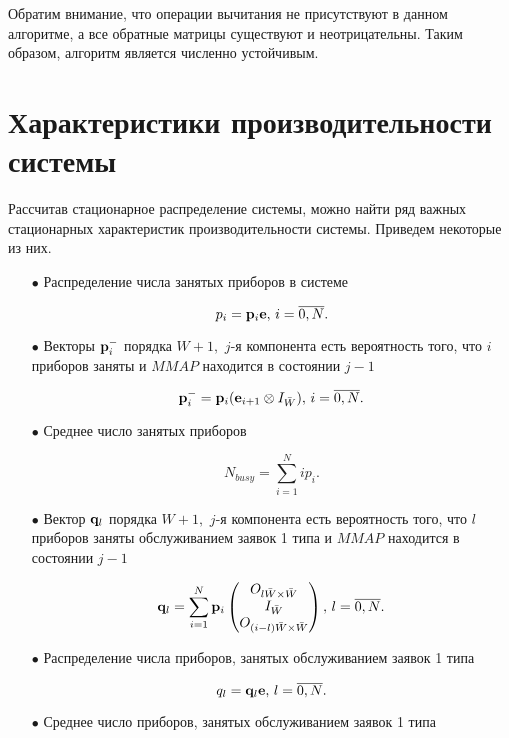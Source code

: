 \documentclass[12pt, a4paper]{article}
\begin{document}
	
	Обратим внимание, что операции вычитания не присутствуют  в данном
	алгоритме, а все обратные  матрицы существуют и неотрицательны.
	Таким образом, алгоритм является  численно устойчивым.
	
	\section{ Характеристики производительности системы}
	
	Рассчитав стационарное  распределение системы, можно
	найти  ряд важных стационарных характеристик производительности
	системы. Приведем некоторые из них.
	
	\begin{itemize}
		\item[$\bullet$] Распределение числа занятых приборов в системе
		
		$$
		p_i={\bf p}_i{\bf e}, \,i=\overline{0,N}.
		$$
		
		\item[$\bullet$] Векторы ${\bf p}_i^-$ порядка $W+1,$ $j$-я компонента есть вероятность того, что $i$ приборов 
		заняты и $MMAP$ находится в состоянии $j-1$
		
		$$
		{\bf p}_i^-={\bf p}_i ({\bf e}_{i+1}\otimes I_{\bar{W}}),\,i=\overline{0,N}.
		$$
		
		
		
		
		
		
		\item[$\bullet$] Среднее  число занятых приборов
		
		$$
		N_{busy}=\sum\limits_{i=1}^N i p_i.
		$$
		
		\item[$\bullet$] Вектор ${\bf q}_l$ порядка $W+1,$ $j$-я компонента есть вероятность того, что $l$ приборов заняты 
		обслуживанием заявок 1 типа и $MMAP$ находится в состоянии $j-1$
		
		$$
		{\bf q}_l=\sum\limits_{i=1}^N {\bf p}_i
		\begin{pmatrix}
		O_{l\bar {W}\times\bar {W}}\cr
		I_{\bar{W}}\cr
		O_{(i-l)\bar {W}\times \bar {W}}\cr
		\end{pmatrix},\,l=\overline{0,N}.
		$$
		
		\item[$\bullet$] Распределение числа  приборов, занятых обслуживанием заявок 1 типа
		
		$$
		q_l={\bf q}_l{\bf e}, \,l=\overline{0,N}.
		$$
		
		\item[$\bullet$] Среднее число  приборов, занятых обслуживанием заявок 1 типа
		

\end{itemize}
\end{document}
